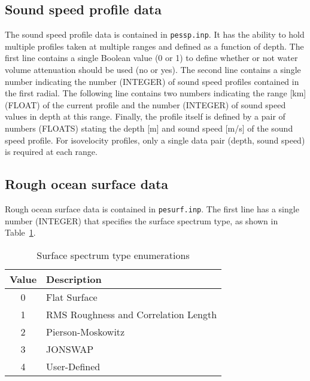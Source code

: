 \subsection{Sound speed profile data}

The sound speed profile data is contained in \texttt{pessp.inp}. It has the ability to hold multiple profiles taken at multiple ranges and defined as a function of depth. The first line contains a single Boolean value (0 or 1) to define whether or not water volume attenuation should be used (no or yes). The second line contains a single number indicating the number (INTEGER) of sound speed profiles contained in the first radial. The following line contains two numbers indicating the range [km] (FLOAT) of the current profile and the number (INTEGER) of sound speed values in depth at this range. Finally, the profile itself is defined by a pair of numbers (FLOATS) stating the depth [m] and sound speed [m/s] of the sound speed profile. For isovelocity profiles, only a single data pair (depth, sound speed) is required at each range.



\subsection{Rough ocean surface data}\label{sec:roughsurface}

Rough ocean surface data is contained in \texttt{pesurf.inp}. The first line has a single number (INTEGER) that specifies the surface spectrum type, as shown in Table~\ref{tab:surfaces}. 

\begin{table}[!ht]
	\begin{center}
		\caption{Surface spectrum type enumerations}
		\label{tab:surfaces}
		\begin{tabular}{c|l} 
			\textbf{Value} & \textbf{Description}\\
			\hline
			0 & Flat Surface \\
			1 & RMS Roughness and Correlation Length \\
			2 & Pierson-Moskowitz \\
			3 & JONSWAP \\
			4 & User-Defined \\
		\end{tabular}
	\end{center}
\end{table}


